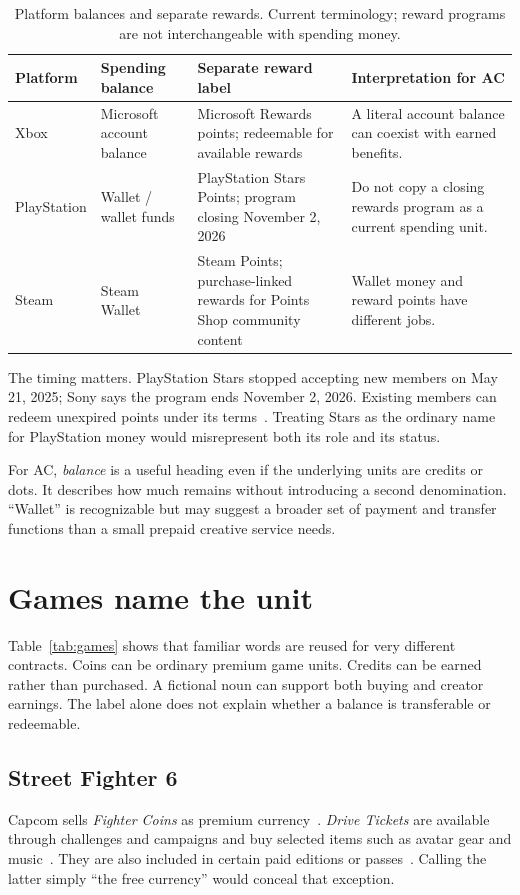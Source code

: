 \documentclass[10pt,letterpaper,twocolumn]{article}
\begin{document}
\begin{table}[t]
\small\renewcommand{\arraystretch}{1.2}
\caption{Platform balances and separate rewards. Current terminology; reward programs are not interchangeable with spending money.}\label{tab:platforms}
\begin{tabularx}{\textwidth}{@{}p{.8in}p{1.45in}XX@{}}\toprule
Platform & Spending balance & Separate reward label & Interpretation for AC \\\midrule
Xbox & Microsoft account balance~\cite{microsoft} & Microsoft Rewards points; redeemable for available rewards~\cite{rewards} & A literal account balance can coexist with earned benefits. \\
PlayStation & Wallet / wallet funds~\cite{playstation} & PlayStation Stars Points; program closing November 2, 2026~\cite{stars} & Do not copy a closing rewards program as a current spending unit. \\
Steam & Steam Wallet~\cite{steam} & Steam Points; purchase-linked rewards for Points Shop community content~\cite{steampoints} & Wallet money and reward points have different jobs. \\\bottomrule
\end{tabularx}
\end{table}

The timing matters. PlayStation Stars stopped accepting new members on May 21, 2025; Sony says the program ends November 2, 2026. Existing members can redeem unexpired points under its terms~\cite{stars}. Treating Stars as the ordinary name for PlayStation money would misrepresent both its role and its status.

For AC, \emph{balance} is a useful heading even if the underlying units are credits or dots. It describes how much remains without introducing a second denomination. ``Wallet'' is recognizable but may suggest a broader set of payment and transfer functions than a small prepaid creative service needs.

\section{Games name the unit}
Table~\ref{tab:games} shows that familiar words are reused for very different contracts. Coins can be ordinary premium game units. Credits can be earned rather than purchased. A fictional noun can support both buying and creator earnings. The label alone does not explain whether a balance is transferable or redeemable.

\subsection{Street Fighter 6}
Capcom sells \emph{Fighter Coins} as premium currency~\cite{sfcoins}. \emph{Drive Tickets} are available through challenges and campaigns and buy selected items such as avatar gear and music~\cite{sftickets}. They are also included in certain paid editions or passes~\cite{sfeditions}. Calling the latter simply ``the free currency'' would conceal that exception.
\end{document}
